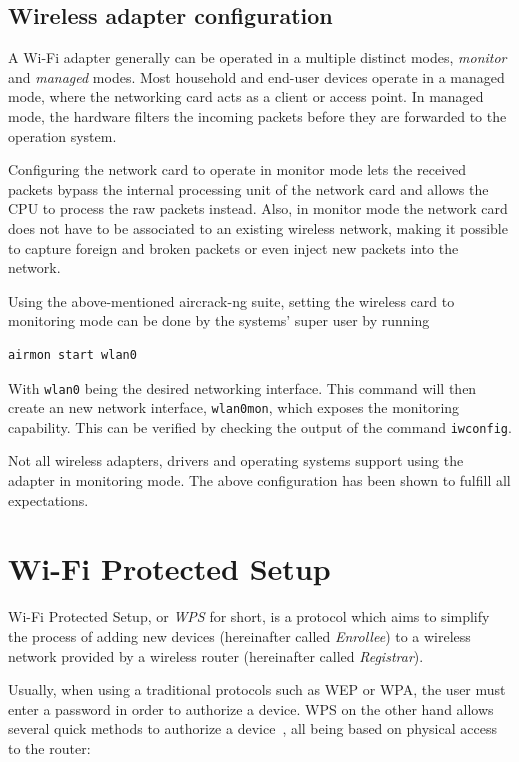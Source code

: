\subsection{Wireless adapter configuration}\label{sec:wificonf}

A Wi-Fi adapter generally can be operated in a multiple distinct modes, \emph{monitor} and \emph{managed} modes. Most household and end-user devices operate in a managed mode, where the networking card acts as a client or access point. In managed mode, the hardware filters the incoming packets before they are forwarded to the operation system. 

Configuring the network card to operate in monitor mode lets the received packets bypass the internal processing unit of the network card and allows the CPU to process the raw packets instead. Also, in monitor mode the network card does not have to be associated to an existing wireless network, making it possible to capture foreign and broken packets or even inject new packets into the network.

Using the above-mentioned aircrack-ng suite, setting the wireless card to monitoring mode can be done by the systems' super user by running

\begin{lstlisting}
airmon start wlan0
\end{lstlisting}

With \lstinline{wlan0} being the desired networking interface. This command will then create an new network interface, \lstinline{wlan0mon}, which exposes the monitoring capability. This can be verified by checking the output of the command \lstinline{iwconfig}.

Not all wireless adapters, drivers and operating systems support using the adapter in monitoring mode. The above configuration has been shown to fulfill all expectations.

\section{Wi-Fi Protected Setup}\label{sec:wps}

Wi-Fi Protected Setup, or \emph{WPS} for short, is a protocol which aims to simplify the process of adding new devices (hereinafter called \emph{Enrollee}) to a wireless network provided by a wireless router (hereinafter called \emph{Registrar}). 

Usually, when using a traditional protocols such as WEP or WPA, the user must enter a password in order to authorize a device. WPS on the other hand allows several quick methods to authorize a device~\cite{WiFi11}, all being based on physical access to the router:

